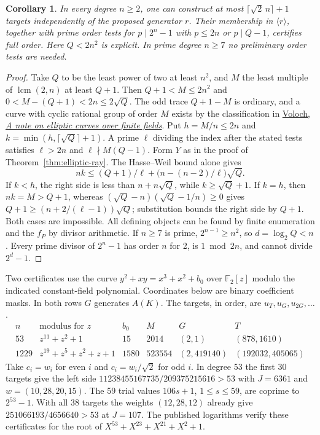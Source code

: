 \documentclass[11pt]{article}
\newtheorem{corollary}[theorem]{Corollary}
\begin{document}
\begin{corollary}\label{cor:elliptic-ray-uniform}
In every degree \(n\ge2\), one can construct at most
\(\lceil\sqrt2\,n\rceil+1\) targets independently of the proposed
generator \(r\). Their membership in \(\langle r\rangle\), together
with prime order tests for \(p\mid 2^n-1\) with \(p\le2n\) or
\(p\mid Q-1\), certifies full order. Here \(Q<2n^2\) is explicit.
In prime degree \(n\ge7\) no preliminary order tests are needed.
\end{corollary}
\begin{proof}
Take \(Q\) to be the least power of two at least \(n^2\), and \(M\)
the least multiple of \(\operatorname{lcm}(2,n)\) at least \(Q+1\).
Then \(Q+1<M\le 2n^2\) and \(0<M-(Q+1)<2n\le2\sqrt Q\).
The odd trace \(Q+1-M\) is ordinary, and a curve with cyclic rational
group of order \(M\) exists by the classification in
\href{https://www.numdam.org/item/10.24033/bsmf.2107.pdf}{Voloch,
\emph{A note on elliptic curves over finite fields}}.
Put \(h=M/n\le2n\) and \(k=\min(h,\lceil\sqrt Q\rceil+1)\).
A prime \(\ell\) dividing the index after the stated tests satisfies
\(\ell>2n\) and \(\ell\nmid M(Q-1)\). Form \(Y\) as in the proof of
Theorem~\ref{thm:elliptic-ray}. The Hasse--Weil bound alone gives
\[
 nk\le (Q+1)/\ell+\bigl(n-(n-2)/\ell\bigr)\sqrt Q .
\]
If \(k<h\), the right side is less than \(n+n\sqrt Q\), while
\(k\ge\sqrt Q+1\). If \(k=h\), then \(nk=M>Q+1\), whereas
\((\sqrt Q-n)(\sqrt Q-1/n)\ge0\) gives
\(Q+1\ge(n+2/(\ell-1))\sqrt Q\); substitution bounds the right
side by \(Q+1\). Both cases are impossible. All defining objects can
be found by finite enumeration and the \(f_P\) by divisor arithmetic.
If \(n\ge7\) is prime, \(2^{n-1}\ge n^2\), so \(d=\log_2 Q<n\).
Every prime divisor of \(2^n-1\) has order \(n\) for 2, is
\(1\bmod 2n\), and cannot divide \(2^d-1\).
\end{proof}

Two certificates use the curve \(y^2+xy=x^3+x^2+b_0\) over
\(\mathbb F_2[z]\) modulo the indicated constant-field polynomial.
Coordinates below are binary coefficient masks. In both rows \(G\)
generates \(A(K)\). The targets, in order, are \(u_T,u_G,u_{2G},\ldots\).
\[
\begin{array}{r|l|r|r|l|l}
 n & \text{modulus for }z & b_0 & M & G & T\\\hline
 53 & z^{11}+z^2+1 & 15 &2014 &(2,1)&(878,1610)\\
 1229 & z^{19}+z^5+z^2+z+1 &1580&523554 &(2,419140)&(192032,405065)
\end{array}
\]
Take \(c_i=w_i\) for even \(i\) and \(c_i=w_i/\sqrt2\) for odd \(i\).
In degree 53 the first 30 targets give the left side
\(11238455167735/209375215616>53\) with \(J=6361\) and
\(w=(10,28,20,15)\). The 59 trial values \(106s+1\), \(1\le s\le59\),
are coprime to \(2^{53}-1\). With all 38 targets the weights
\((12,28,12)\) already give \(251066193/4656640>53\) at \(J=107\).
The published logarithms verify these certificates for the root of
\(X^{53}+X^{23}+X^{21}+X^2+1\).
\end{document}
